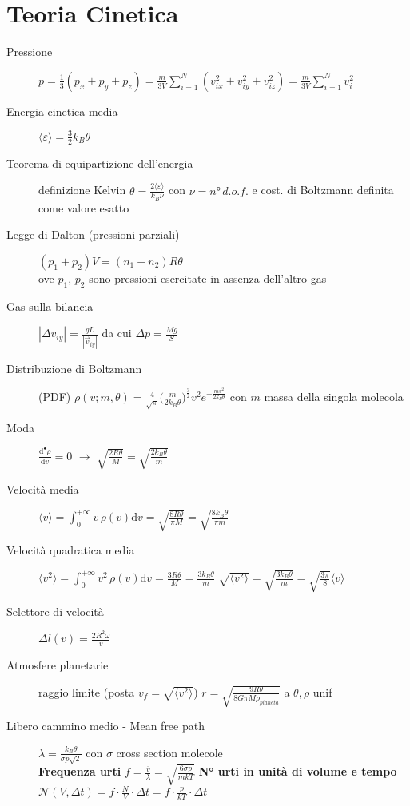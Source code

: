 \documentclass[10pt, oneside]{article}
\begin{document}
\section{Teoria Cinetica}
\begin{description}
\item[Pressione] $\displaystyle p = \frac{1}{3} (p_x + p_y + p_z) = \frac{m}{3V} \sum\limits_{i=1}^N (v_{ix}^2 + v_{iy}^2 + v_{iz}^2) = \frac{m}{3V} \sum\limits_{i=1}^N v_i^2$
\item[Energia cinetica media] $\boxed{\displaystyle \langle \varepsilon \rangle = \frac{3}{2} k_B \theta}$
\item[Teorema di equipartizione dell'energia] definizione Kelvin $\displaystyle \theta = \frac{2 \langle \varepsilon \rangle }{k_B \nu}$ con $\nu  = n° \, d.o.f.$ e cost. di Boltzmann definita come valore esatto
\item[Legge di Dalton (pressioni parziali)] $\boxed{\displaystyle (p_1 + p_2) V = (n_1 + n_2) R \theta}$ \\ove $p_1, \, p_2$ sono pressioni esercitate in assenza dell'altro gas
\item[Gas sulla bilancia] $\displaystyle |\Delta v_{iy}| = \frac{gL}{|\vec{v}_{iy}|}$ da cui $\displaystyle \Delta p = \frac{Mg}{S}$
\item[Distribuzione di Boltzmann] (PDF) $\boxed{\displaystyle \rho (v; m, \theta) = \frac{4}{\sqrt{\pi}} \big(\frac{m}{2k_B \theta}\big)^{\frac{3}{2}} v^2 e^{\displaystyle - \frac{mv^2}{2k_B \theta}}}$ con $m$ massa della singola molecola
\item[Moda] $\displaystyle \frac{\mathrm{d}^{•} \rho}{\mathrm{d}v^{}} = 0$ $\rightarrow$ $\displaystyle \sqrt{\frac{2 R \theta}{M}} = \sqrt{\frac{2 k_B \theta}{m}}$
\item[Velocità media] $\displaystyle \langle v \rangle = \int_{0}^{+\infty}v \, \rho(v) \mathrm{d}v = \sqrt{\frac{8 R \theta}{\pi M}} = \sqrt{\frac{8 k_B \theta}{\pi m}}$
\item[Velocità quadratica media] \hfill $\displaystyle \langle v^2 \rangle = \int_{0}^{+\infty}v^2 \, \rho(v) \mathrm{d}v = \frac{3 R \theta}{M} = \frac{3 k_B \theta}{m}$ \hfill \bigg\rangle \hfill $\displaystyle \sqrt{\langle v^2 \rangle} = \sqrt{\frac{3 k_B \theta}{m}} = \sqrt{\frac{3 \pi}{8}} \langle v \rangle$ \hfill 
\item[Selettore di velocità] $\displaystyle \Delta l(v) = \frac{2 R^2 \omega}{v}$
\item[Atmosfere planetarie] raggio limite (posta $v_f = \sqrt{\langle v^2 \rangle}$) $\displaystyle r = \sqrt{\frac{9 R \theta}{8 G \pi M \rho_{pianeta}}}$ a $\theta, \rho$ unif
\item[Libero cammino medio - Mean free path] $\displaystyle \lambda = \frac{k_B \theta}{\sigma p \sqrt{2}}$ con $\sigma$ cross section molecole
\\\textbf{Frequenza urti} $\displaystyle f = \frac{\overline{v}}{\lambda} = \sqrt{\frac{6 \sigma p}{m k T}}$ \textbf{N° urti in unità di volume e tempo} $\displaystyle \mathcal{N}(V, \Delta t) = f \cdot \frac{N}{V} \cdot \Delta t = f \cdot \frac{p}{k T} \cdot \Delta t$
\end{description}
\end{document}
